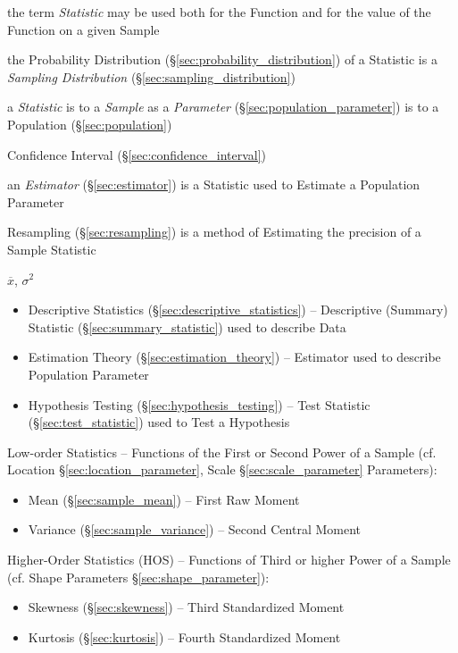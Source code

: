 the term \emph{Statistic} may be used both for the Function and for the value of
the Function on a given Sample

the Probability Distribution (\S\ref{sec:probability_distribution}) of a
Statistic is a \emph{Sampling Distribution} (\S\ref{sec:sampling_distribution})

a \emph{Statistic} is to a \emph{Sample} as a \emph{Parameter}
(\S\ref{sec:population_parameter}) is to a Population (\S\ref{sec:population})

Confidence Interval (\S\ref{sec:confidence_interval})

\fist an \emph{Estimator} (\S\ref{sec:estimator}) is a Statistic used to
Estimate a Population Parameter

\fist Resampling (\S\ref{sec:resampling}) is a method of Estimating the
precision of a Sample Statistic

$\overline{x}$, $\sigma^2$

\begin{itemize}
  \item Descriptive Statistics (\S\ref{sec:descriptive_statistics}) --
    Descriptive (Summary) Statistic (\S\ref{sec:summary_statistic}) used to
    describe Data
  \item Estimation Theory (\S\ref{sec:estimation_theory}) -- Estimator used to
    describe Population Parameter
  \item Hypothesis Testing (\S\ref{sec:hypothesis_testing}) -- Test Statistic
    (\S\ref{sec:test_statistic}) used to Test a Hypothesis
\end{itemize}

Low-order Statistics -- Functions of the First or Second Power of a Sample (cf.
Location \S\ref{sec:location_parameter}, Scale \S\ref{sec:scale_parameter}
Parameters):
\begin{itemize}
  \item Mean (\S\ref{sec:sample_mean}) -- First Raw Moment
  \item Variance (\S\ref{sec:sample_variance}) -- Second Central Moment
\end{itemize}

Higher-Order Statistics (HOS) -- Functions of Third or higher Power of a Sample
(cf. Shape Parameters \S\ref{sec:shape_parameter}):
\begin{itemize}
  \item Skewness (\S\ref{sec:skewness}) -- Third Standardized Moment
  \item Kurtosis (\S\ref{sec:kurtosis}) -- Fourth Standardized Moment
\end{itemize}

